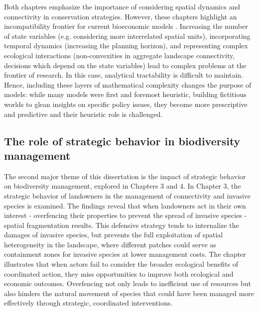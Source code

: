 Both chapters emphasize the importance of considering spatial dynamics and connectivity in conservation strategies.  However, these chapters highlight an incompatibility frontier for current bioeconomic models \citep{levin_social-ecological_2013}. Increasing the number of state variables (e.g. considering more interrelated spatial units), incorporating temporal dynamics (increasing the planning horizon), and representing complex ecological interactions (non-convexities in aggregate landscape connectivity, decisions which depend on the state variables) lead to complex problems at the frontier of research. In this case, analytical tractability is difficult to maintain. Hence, including these layers of mathematical complexity changes the purpose of models: while many models were first and foremost heuristic, building fictitious worlds to glean insights on specific policy issues, they become more prescriptive and predictive  \citep{varenne_epistemologie_2014} and their heuristic role is challenged. 


{}
\subsection*{The role of strategic behavior in biodiversity management}

The second major theme of this dissertation is the impact of strategic behavior on biodiversity management, explored in Chapters 3 and 4. In Chapter 3, the strategic behavior of landowners in the management of connectivity and invasive species is examined. The findings reveal that when landowners act in their own interest - overfencing their properties to prevent the spread of invasive species - spatial fragmentation results. This defensive strategy tends to internalize the damages of invasive species, but prevents the full exploitation of spatial heterogeneity in the landscape, where different patches could serve as containment zones for invasive species at lower management costs. The chapter illustrates that when actors fail to consider the broader ecological benefits of coordinated action, they miss opportunities to improve both ecological and economic outcomes. Overfencing not only leads to inefficient use of resources but also hinders the natural movement of species that could have been managed more effectively through strategic, coordinated interventions.

